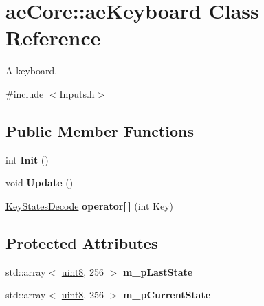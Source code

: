 \hypertarget{classae_core_1_1ae_keyboard}{}\section{ae\+Core\+:\+:ae\+Keyboard Class Reference}
\label{classae_core_1_1ae_keyboard}


A keyboard.  




{\ttfamily \#include $<$Inputs.\+h$>$}

\subsection*{Public Member Functions}
\begin{DoxyCompactItemize}
\item 
int {\bfseries Init} ()\hypertarget{classae_core_1_1ae_keyboard_ad3514f4fa8fdf101456e10194b8c7409}{}\label{classae_core_1_1ae_keyboard_ad3514f4fa8fdf101456e10194b8c7409}

\item 
void {\bfseries Update} ()\hypertarget{classae_core_1_1ae_keyboard_a50918fe2fd413008f7d6740a4b461736}{}\label{classae_core_1_1ae_keyboard_a50918fe2fd413008f7d6740a4b461736}

\item 
\hyperlink{namespaceae_core_aa7afae6827a908a9adc5250cf17d52cb}{Key\+States\+Decode} {\bfseries operator\mbox{[}$\,$\mbox{]}} (int Key)\hypertarget{classae_core_1_1ae_keyboard_a4a7046fe89f379e59c14ffc1a4593a99}{}\label{classae_core_1_1ae_keyboard_a4a7046fe89f379e59c14ffc1a4593a99}

\end{DoxyCompactItemize}
\subsection*{Protected Attributes}
\begin{DoxyCompactItemize}
\item 
std\+::array$<$ \hyperlink{namespaceae_core_aa13093dc911869e5b24942552898f01f}{uint8}, 256 $>$ {\bfseries m\+\_\+p\+Last\+State}\hypertarget{classae_core_1_1ae_keyboard_aa9edb16b75d5a1a90e047d92266a4ee3}{}\label{classae_core_1_1ae_keyboard_aa9edb16b75d5a1a90e047d92266a4ee3}

\item 
std\+::array$<$ \hyperlink{namespaceae_core_aa13093dc911869e5b24942552898f01f}{uint8}, 256 $>$ {\bfseries m\+\_\+p\+Current\+State}\hypertarget{classae_core_1_1ae_keyboard_ac5b064e8ad23f19dcba4555cd2905ba5}{}\label{classae_core_1_1ae_keyboard_ac5b064e8ad23f19dcba4555cd2905ba5}

\end{DoxyCompactItemize}


